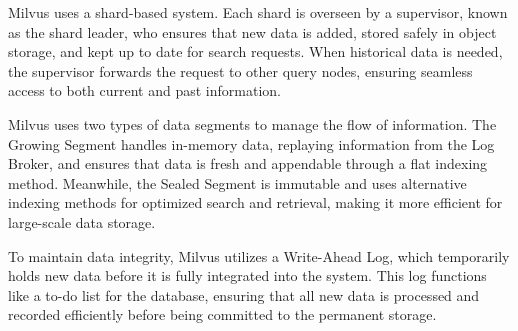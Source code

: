 Milvus uses a shard-based system. 
Each shard is overseen by a supervisor, known as the shard leader, who ensures that new data is added, stored safely in object storage, and kept up to date for search requests. 
When historical data is needed, the supervisor forwards the request to other query nodes, ensuring seamless access to both current and past information.

Milvus uses two types of data segments to manage the flow of information. 
The Growing Segment handles in-memory data, replaying information from the Log Broker, and ensures that data is fresh and appendable through a flat indexing method.
Meanwhile, the Sealed Segment is immutable and uses alternative indexing methods for optimized search and retrieval, making it more efficient for large-scale data storage.

To maintain data integrity, Milvus utilizes a Write-Ahead Log, which temporarily holds new data before it is fully integrated into the system. 
This log functions like a to-do list for the database, ensuring that all new data is processed and recorded efficiently before being committed to the permanent storage.